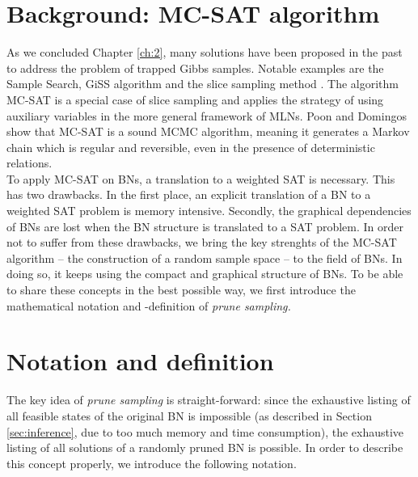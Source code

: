 \documentclass[a4paper, twoside, 11pt]{report}
\theoremstyle{plain}
\theoremstyle{definition}
\theoremstyle{remark}
\newcommand{\ps}{\textit{prune sampling }}
\newcommand{\psp}{\textit{prune sampling. }}
\begin{document}
\section{Background: MC-SAT algorithm}
As we concluded Chapter \ref{ch:2}, many solutions have been proposed in the past to address the problem of trapped Gibbs samples. Notable examples are the Sample Search, GiSS algorithm \cite{venugopal2013giss} and the slice sampling method \cite{besag1993spatial, damlen1999gibbs, gilks1996interdisciplinary}. The algorithm MC-SAT \cite{poon2006sound} is a special case of slice sampling and applies the strategy of using auxiliary variables in the more general framework of \gls{MLNs}. Poon and Domingos show that MC-SAT is a sound MCMC algorithm, meaning it generates a Markov chain which is regular and reversible, even in the presence of deterministic relations. \\

To apply MC-SAT on BNs, a translation to a weighted \gls{SAT} is necessary. This has two drawbacks. In the first place, an explicit translation of a BN to a weighted SAT problem is memory intensive. Secondly, the graphical dependencies of BNs are lost when the BN structure is translated to a SAT problem. In order not to suffer from these drawbacks, we bring the key strenghts of the MC-SAT algorithm -- the construction of a random sample space --  to the field of BNs. In doing so, it keeps using the compact and graphical structure of BNs. To be able to share these concepts in the best possible way, we first introduce the mathematical notation and -definition of \psp

\section{Notation and definition}
The key idea of \ps is straight-forward: since the exhaustive listing of all feasible states of the original BN is impossible (as described in Section \ref{sec:inference}, due to too much memory and time consumption), the exhaustive listing of all solutions of a randomly pruned BN is possible. In order to describe this concept properly, we introduce the following notation. \\
\end{document}
